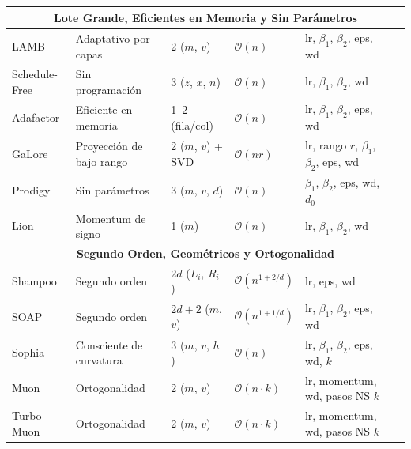 \begin{longtable}{p{2.0cm}p{2.0cm}p{2.2cm}p{2.0cm}p{3.8cm}p{2.5cm}}
\multicolumn{6}{c}{\textbf{Lote Grande, Eficientes en Memoria y Sin Parámetros}} \\
\midrule
LAMB & Adaptativo por capas & 2 ($m$, $v$) & $\mathcal{O}(n)$ & lr, $\beta_1$, $\beta_2$, eps, wd & \citep{you_largebatch_2020} \\
Schedule-Free & Sin programación & 3 ($z$, $x$, $n$) & $\mathcal{O}(n)$ & lr, $\beta_1$, $\beta_2$, wd & \citep{defazio_road_2024} \\
Adafactor & Eficiente en memoria & 1--2 (fila/col) & $\mathcal{O}(n)$ & lr, $\beta_1$, $\beta_2$, eps, wd & \citep{shazeer_adafactor_2018} \\
GaLore & Proyección de bajo rango & 2 ($m$, $v$) + SVD & $\mathcal{O}(n r)$ & lr, rango $r$, $\beta_1$, $\beta_2$, eps, wd & \citep{zhao_galore_2024} \\
Prodigy & Sin parámetros & 3 ($m$, $v$, $d$) & $\mathcal{O}(n)$ & $\beta_1$, $\beta_2$, eps, wd, $d_0$ & \citep{mishchenko_prodigy_2023} \\
Lion & Momentum de signo & 1 ($m$) & $\mathcal{O}(n)$ & lr, $\beta_1$, $\beta_2$, wd & \citep{chen_symbolic_2023} \\
\midrule

\multicolumn{6}{c}{\textbf{Segundo Orden, Geométricos y Ortogonalidad}} \\
\midrule
Shampoo & Segundo orden & $2d$ ($L_i$, $R_i$) & $\mathcal{O}(n^{1+2/d})$ & lr, eps, wd & \citep{gupta_shampoo_2018} \\
SOAP & Segundo orden & $2d + 2$ ($m$, $v$) & $\mathcal{O}(n^{1+1/d})$ & lr, $\beta_1$, $\beta_2$, eps, wd & \citep{vyas_soap_2024} \\
Sophia & Consciente de curvatura & 3 ($m$, $v$, $h$) & $\mathcal{O}(n)$ & lr, $\beta_1$, $\beta_2$, eps, wd, $k$ & \citep{liu_sophia_2023} \\
Muon & Ortogonalidad & 2 ($m$, $v$) & $\mathcal{O}(n \cdot k)$ & lr, momentum, wd, pasos NS $k$ & \citep{shen_convergence_2025} \\
Turbo-Muon & Ortogonalidad & 2 ($m$, $v$) & $\mathcal{O}(n \cdot k)$ & lr, momentum, wd, pasos NS $k$ & \citep{boissin_turbo-muon_2025} \\
\midrule


\end{longtable}
